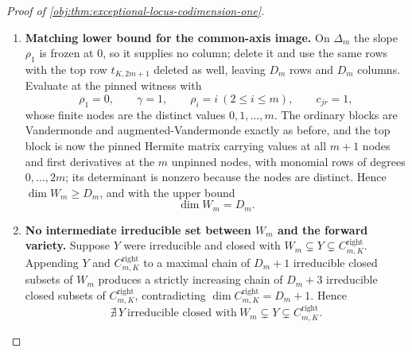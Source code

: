 \documentclass[11pt]{article}
\begin{document}
\begin{proof}[Proof of \cref{obj:thm:exceptional-locus-codimension-one}]
\begin{enumerate}
\begin{itemize}
\end{itemize}
The product of the diagonal determinants is nonzero, so the selected minor is a nonzero polynomial and
\[
\dim C^{\mathrm{right}}_{m,K}\ge D_m+1 .
\]
With the upper bound of the previous step, \(\dim C^{\mathrm{right}}_{m,K}=D_m+1\).

\item \textbf{Matching lower bound for the common-axis image.}  On \(\Delta_m\) the slope \(\rho_1\) is frozen at \(0\), so it supplies no column; delete it and use the same rows with the top row \(t_{K,2m+1}\) deleted as well, leaving \(D_m\) rows and \(D_m\) columns.  Evaluate at the pinned witness with
\[
\rho_1=0,\qquad \gamma=1,\qquad \rho_i=i\ (2\le i\le m),\qquad c_{jr}=1 ,
\]
whose finite nodes are the distinct values \(0,1,\ldots,m\).  The ordinary blocks are Vandermonde and augmented-Vandermonde exactly as before, and the top block is now the pinned Hermite matrix carrying values at all \(m+1\) nodes and first derivatives at the \(m\) unpinned nodes, with monomial rows of degrees \(0,\ldots,2m\); its determinant is nonzero because the nodes are distinct.  Hence \(\dim W_m\ge D_m\), and with the upper bound
\[
\dim W_m=D_m .
\]

\item \textbf{No intermediate irreducible set between \(W_m\) and the forward variety.}  Suppose \(Y\) were irreducible and closed with \(W_m\subsetneq Y\subsetneq C^{\mathrm{right}}_{m,K}\).  Appending \(Y\) and \(C^{\mathrm{right}}_{m,K}\) to a maximal chain of \(D_m+1\) irreducible closed subsets of \(W_m\) produces a strictly increasing chain of \(D_m+3\) irreducible closed subsets of \(C^{\mathrm{right}}_{m,K}\), contradicting \(\dim C^{\mathrm{right}}_{m,K}=D_m+1\).  Hence
\[
\nexists\,Y\ \text{irreducible closed with}\ W_m\subsetneq Y\subsetneq C^{\mathrm{right}}_{m,K}.
\]


\end{enumerate}
\end{proof}
\end{document}
